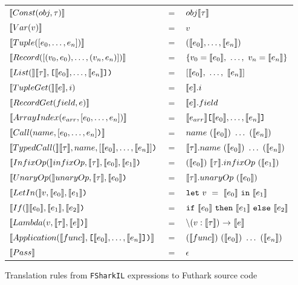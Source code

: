 \begin{figure}
  \centering
  \begin{tabular}{@{}l c l}%
  $\llbracket Const(obj, \tau ) \rrbracket$ & $=$ & $obj\llbracket \tau \rrbracket$ \\
  $\llbracket Var(v) \rrbracket$ & $=$ & $v$\\
  $\llbracket Tuple([e_0,\ldots, e_n]) \rrbracket$ & $=$ & $(\llbracket e_0 \rrbracket,\ldots, \llbracket e_n \rrbracket)$\\
  $\llbracket Record([(v_0, e_0),\ldots,(v_n,e_n)]) \rrbracket$ & $=$ & $\{v_0=\llbracket e_0 \rrbracket,~\ldots,~v_n=\llbracket e_n \rrbracket\}$ \\
  $\llbracket List( \rrbracket\llbracket \tau \rrbracket,\text{\ttfamily [}\llbracket e_0 \rrbracket,\ldots, \llbracket e_n \rrbracket\text{\ttfamily ]}\text{\ttfamily )}$ & $=$ & $[\llbracket e_0 \rrbracket,~\ldots,~\llbracket e_n \rrbracket]$\\
  $\llbracket TupleGet( \rrbracket\llbracket e \rrbracket, i{)}$ & $=$ & $\llbracket e \rrbracket.i$ \\
  $\llbracket RecordGet(field, e) \rrbracket$ & $=$ & $\llbracket e \rrbracket.field$ \\
  $\llbracket ArrayIndex(e_{arr},[e_0, \ldots, e_n]) \rrbracket$ & $=$ & $\llbracket e_{arr} \rrbracket\text{\ttfamily [}\llbracket e_0 \rrbracket,\ldots,\llbracket e_n \rrbracket\text{\ttfamily ]}$ \\
    
  $\llbracket Call(name, [e_0,\ldots,e_n]\text{\ttfamily )} \rrbracket$ & $=$ & $name~(\llbracket e_0 \rrbracket)~\ldots~(\llbracket e_n \rrbracket)$ \\
  $\llbracket TypedCall( \rrbracket\llbracket \tau \rrbracket,name, [\llbracket e_0 \rrbracket, \ldots, \llbracket e_n \rrbracket]\text{\ttfamily )}$ & $=$ & $\llbracket \tau \rrbracket.name~(\llbracket e_0 \rrbracket)~\ldots~(\llbracket e_n \rrbracket)$ \\
  $\llbracket InfixOp( \rrbracket infixOp, \llbracket \tau \rrbracket, \llbracket e_0 \rrbracket, \llbracket e_1 \rrbracket\text{\ttfamily )}$ & $=$ & $(\llbracket e_0 \rrbracket)~\llbracket \tau \rrbracket.infixOp~(\llbracket e_1 \rrbracket)$ \\
  $\llbracket UnaryOp( \rrbracket unaryOp, \llbracket \tau \rrbracket, \llbracket e_0 \rrbracket\text{\ttfamily )}$ & $=$ & $\llbracket \tau \rrbracket.unaryOp~(\llbracket e_0 \rrbracket)$ \\

  $\llbracket LetIn( \rrbracket v, \llbracket e_0 \rrbracket, \llbracket e_1 \rrbracket\text{\ttfamily )}$ & $=$ & $\mathtt{let}~v~=~\llbracket e_0 \rrbracket~\mathtt{in}~\llbracket e_1 \rrbracket$ \\

  $\llbracket If( \rrbracket\llbracket e_0 \rrbracket, \llbracket e_1 \rrbracket, \llbracket e_2 \rrbracket\text{\ttfamily )}$ & $=$ & $\mathtt{if}~\llbracket e_0 \rrbracket~\mathtt{then}~\llbracket e_1 \rrbracket~\mathtt{else}~\llbracket e_2 \rrbracket$ \\

  $\evals{Lambda(v, \evals{\tau}, \evals{e} \lit{)}}$ & $=$ & $\mathtt{\backslash}(v : \evals{\tau})~\mathtt{->}~\evals{e}$ \\
  $\evals{Application(\evals{func}, \lit{[}\evals{e_0},\ldots, \evals{e_n}\lit{])}}$ & $=$ & $(\evals{func})~(\evals{e_0})~\ldots~(\evals{e_n})$ \\
  $\evals{Pass}$ & $=$ & $\epsilon$ $$ \\
\end{tabular}
\caption{Translation rules from \texttt{FSharkIL} expressions to Futhark source code}
\label{fig:fsharkiltofutharktypes}
\end{figure}




